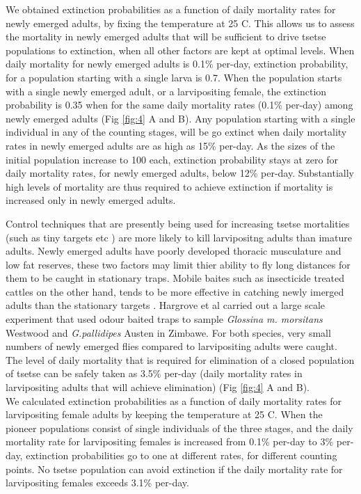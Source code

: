 We obtained extinction probabilities as a function of daily mortality rates for newly emerged adults, by
fixing the temperature at 25 \degree C. This allows us to assess the mortality in newly emerged adults that will be sufficient to drive tsetse populations to extinction, when all other factors are kept at optimal levels. When daily mortality for newly emerged adults is 0.1\% per-day, extinction probability, for a population starting with a single larva is 0.7. When the population starts with a single newly emerged adult, or a larvipositing female, the extinction probability is 0.35 when for the same daily mortality rates (0.1\% per-day) among  newly emerged adults (Fig \ref{fig:4} A and B). Any population starting with a single individual in any of the counting stages, will be go extinct when daily mortality rates in newly emerged adults are as high as 15\% per-day. As the sizes of the initial population increase to 100 each, extinction probability stays at zero for daily mortality rates, for newly emerged adults, below 12\% per-day. Substantially high levels of mortality are thus required to achieve extinction if mortality is increased only in newly emerged adults.
 

Control techniques that are presently being used for increasing tsetse mortalities (such as tiny targets etc \cite{Hargrove2000,Esterhuizen2006,Shaw2015,Mbewe2018a}) are more likely to kill larvipositng adults than imature adults. Newly emerged adults have poorly developed thoracic musculature and low fat reserves, these two factors may limit thier ability to fly long distances for them to be caught in stationary traps. Mobile baites such as insecticide treated cattles on the other hand, tends to be more effective in catching newly imerged adults than the stationary targets \cite{Hargrove1991}. Hargrove et al \cite{HargroveJ.W.HollowayM.T.P.ValeG.A.GoughA.J.E.Hall1995} carried out a large scale experiment that used  odour baited traps to sample  {\it Glossina m. morsitans} Westwood and {\it G.pallidipes} Austen in Zimbawe. For both species, very small numbers of newly emerged flies compared to larvipositing adults were caught. The level of daily mortality that is required for elimination of a closed population of tsetse can be safely taken as 3.5\% per-day (daily mortality rates in larvipositing adults that will achieve elimination) (Fig \ref{fig:4} A and B).  \\


We calculated extinction probabilities as a function of daily mortality rates for larvipositing female adults by keeping the temperature at 25 \degree C. When the pioneer populations consist of single individuals of the three stages, and the daily mortality rate for larvipositing females is increased from 0.1\% per-day to 3\% per-day, extinction probabilities go to one at different rates, for different counting points. No tsetse population can avoid extinction if the daily mortality rate for larvipositing females exceeds 3.1\% per-day\cite{Are2019}.




